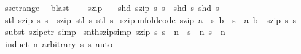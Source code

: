 \begin{isabellebody}
\ sset{\isacharunderscore}range\ \isamarkupfalse%
\ blast\isanewline
\ \ \isamarkupfalse%
\isanewline
{}\isamarkupfalse%
%
\endisatagproof
{\isafoldproof}%
%
\isadelimproof
%
\endisadelimproof
%
\isadelimdocument
%
\endisadelimdocument
%
\isatagdocument
%
\isamarkuptrue%
%
\endisatagdocument
{\isafolddocument}%
%
\isadelimdocument
%
\endisadelimdocument
{}\isamarkupfalse%
\ szip\ \isanewline
\ \ {\isachardoublequoteopen}shd\ {\isacharparenleft}szip\ s{}\ s{}{\isacharparenright}\ {\isacharequal}\ {\isacharparenleft}shd\ s{}{\isacharcomma}\ shd\ s{}{\isacharparenright}{\isachardoublequoteclose}\isanewline
{\isacharbar}\ {\isachardoublequoteopen}stl\ {\isacharparenleft}szip\ s{}\ s{}{\isacharparenright}\ {\isacharequal}\ szip\ {\isacharparenleft}stl\ s{}{\isacharparenright}\ {\isacharparenleft}stl\ s{}{\isacharparenright}{\isachardoublequoteclose}\isanewline
\isanewline
{}\isamarkupfalse%
\ szip{\isacharunderscore}unfold{\isacharbrackleft}code{\isacharbrackright}{\isacharcolon}\ {\isachardoublequoteopen}szip\ {\isacharparenleft}a\ {\isacharhash}{\isacharhash}\ s{}{\isacharparenright}\ {\isacharparenleft}b\ {\isacharhash}{\isacharhash}\ s{}{\isacharparenright}\ {\isacharequal}\ {\isacharparenleft}a{\isacharcomma}\ b{\isacharparenright}\ {\isacharhash}{\isacharhash}\ {\isacharparenleft}szip\ s{}\ s{}{\isacharparenright}{\isachardoublequoteclose}\isanewline
%
\isadelimproof
\ \ %
\endisadelimproof
%
\isatagproof
{}\isamarkupfalse%
\ {\isacharparenleft}subst\ szip{\isachardot}ctr{\isacharparenright}\ simp%
\endisatagproof
{\isafoldproof}%
%
\isadelimproof
\isanewline
%
\endisadelimproof
\isanewline
{}\isamarkupfalse%
\ snth{\isacharunderscore}szip{\isacharbrackleft}simp{\isacharbrackright}{\isacharcolon}\ {\isachardoublequoteopen}szip\ s{}\ s{}\ {\isacharbang}{\isacharbang}\ n\ {\isacharequal}\ {\isacharparenleft}s{}\ {\isacharbang}{\isacharbang}\ n{\isacharcomma}\ s{}\ {\isacharbang}{\isacharbang}\ n{\isacharparenright}{\isachardoublequoteclose}\isanewline
%
\isadelimproof
\ \ %
\endisadelimproof
%
\isatagproof
{}\isamarkupfalse%
\ {\isacharparenleft}induct\ n\ arbitrary{\isacharcolon}\ s{}\ s{}{\isacharparenright}\ auto%
\endisatagproof
{\isafoldproof}%
%
\isadelimproof
\isanewline

\end{isabellebody}
